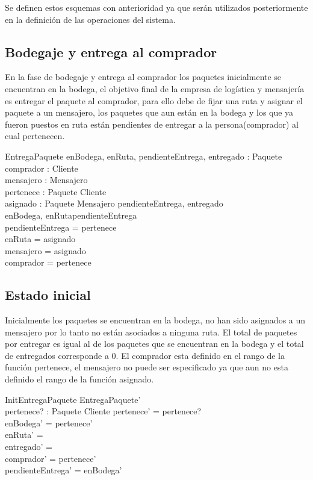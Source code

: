 \documentclass[12pt,a4paper]{article}
\begin{document}
Se definen estos esquemas con anterioridad ya que serán utilizados posteriormente en la definición de las operaciones del sistema.

\subsection{Bodegaje y entrega al comprador}

En la fase de bodegaje y entrega al comprador los paquetes inicialmente se encuentran en la bodega, el objetivo final de la empresa de logística y mensajería es entregar el paquete al comprador, para ello debe de fijar una ruta y asignar el paquete a un mensajero, los paquetes que aun están en la bodega y los que ya fueron puestos en ruta están pendientes de entregar a la persona(comprador) al cual pertenecen.

\begin{schema}{EntregaPaquete}
enBodega, enRuta, pendienteEntrega, entregado : \power Paquete\\
comprador : \power Cliente\\ 
mensajero : \power Mensajero\\
pertenece : Paquete \pfun Cliente\\
asignado : Paquete \pfun Mensajero
\where
\disjoint \langle pendienteEntrega, entregado \rangle\\
\langle enBodega, enRuta\rangle \partition pendienteEntrega \\
pendienteEntrega = \dom pertenece \\
enRuta = \dom asignado\\
mensajero = \ran asignado\\
comprador = \ran pertenece
\end{schema}

\subsection{Estado inicial}

Inicialmente los paquetes se encuentran en la bodega, no han sido asignados a un mensajero por lo tanto no están asociados a ninguna ruta. El total de paquetes por entregar es igual al de los paquetes que se encuentran en la bodega y el total de entregados corresponde a 0. El comprador esta definido en el rango de la función pertenece, el mensajero no puede ser especificado ya que aun no esta definido el rango de la función asignado.

\begin{schema}{InitEntregaPaquete}
EntregaPaquete'\\
pertenece? : Paquete \pfun Cliente
\where
pertenece' = pertenece?\\
enBodega' = \dom pertenece'\\
enRuta' = \emptyset\\
entregado' = \emptyset\\
comprador' = \ran pertenece'\\
pendienteEntrega' = enBodega'
\end{schema}
\end{document}
